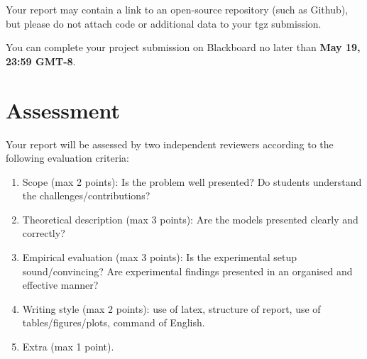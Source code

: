 Your report may contain a link to an open-source repository (such as Github), but please do not attach code or additional data to your tgz submission.

You can complete your project submission on Blackboard no later than {\bf May 19, 23:59 GMT-8}.

\section{Assessment}

Your report will be assessed by two independent reviewers according to the following evaluation criteria:
\begin{enumerate}
	\item Scope (max 2 points): Is the problem well presented? Do students understand the challenges/contributions?
	\item Theoretical description (max 3 points): Are the models presented clearly and correctly?
	\item Empirical evaluation (max 3 points): Is the experimental setup sound/convincing? Are experimental findings presented in an organised and effective manner? 
	\item Writing style (max 2 points): use of latex, structure of report, use of tables/figures/plots, command of English.	
	\item Extra (max 1 point).
\end{enumerate}




